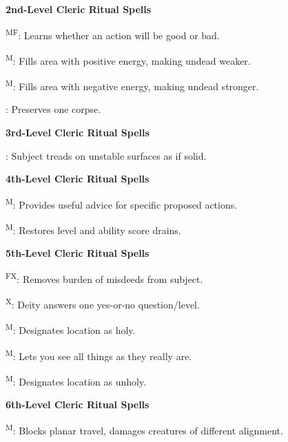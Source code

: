 \noindent\textbf{2nd-Level Cleric Ritual Spells}
\begin{itemize*}
	\item[] \textsuperscript{MF}: Learns whether an action will be good or bad.
	\item[] \textsuperscript{M}: Fills area with positive energy, making undead weaker.
	\item[] \textsuperscript{M}: Fills area with negative energy, making undead stronger.
	\item[] : Preserves one corpse.
\end{itemize*}

\noindent\textbf{3rd-Level Cleric Ritual Spells}
\begin{itemize*}
	\item[] : Subject treads on unstable surfaces as if solid. %
\end{itemize*}

\noindent\textbf{4th-Level Cleric Ritual Spells}
\begin{itemize*}
	\item[] \textsuperscript{M}: Provides useful advice for specific proposed actions.
	\item[] \textsuperscript{M}: Restores level and ability score drains.
\end{itemize*}

\noindent\textbf{5th-Level Cleric Ritual Spells}
\begin{itemize*}
	\item[] \textsuperscript{FX}: Removes burden of misdeeds from subject.
	\item[] \textsuperscript{X}: Deity answers one yes-or-no question/level.
	\item[] \textsuperscript{M}: Designates location as holy.
	\item[] \textsuperscript{M}: Lets you see all things as they really are.
	\item[] \textsuperscript{M}: Designates location as unholy.
\end{itemize*}

\noindent\textbf{6th-Level Cleric Ritual Spells}
\begin{itemize*}
	\item[] \textsuperscript{M}: Blocks planar travel, damages creatures of different alignment.
\end{itemize*}



